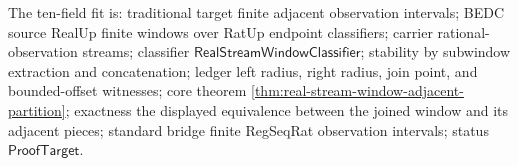The ten-field fit is: traditional target finite adjacent observation
intervals; BEDC source RealUp finite windows over RatUp endpoint classifiers;
carrier rational-observation streams; classifier
$\mathsf{RealStreamWindowClassifier}$; stability by subwindow extraction and
concatenation; ledger left radius, right radius, join point, and
bounded-offset witnesses; core theorem
\autoref{thm:real-stream-window-adjacent-partition}; exactness the displayed
equivalence between the joined window and its adjacent pieces; standard bridge
finite RegSeqRat observation intervals; status $\mathsf{ProofTarget}$.
